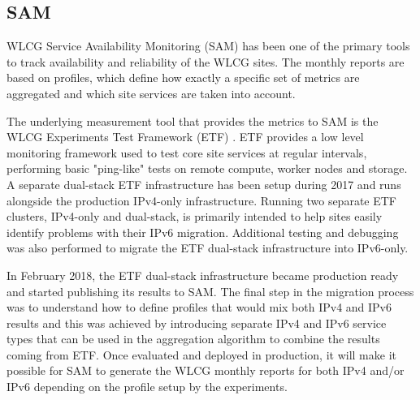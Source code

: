 
\subsection{SAM}
WLCG Service Availability Monitoring (SAM) \cite{sam} has been one of the primary tools to track
availability and reliability of the WLCG sites. The monthly 
reports are based on profiles, which define how exactly a specific set of metrics are aggregated and which site services are taken into account. 

The underlying measurement tool that provides the metrics to SAM is the WLCG Experiments Test Framework (ETF) \cite{etf}. ETF provides a low level monitoring framework used to test core site services at regular intervals, performing basic "ping-like" tests on remote compute, worker nodes and storage. A separate dual-stack ETF infrastructure has been setup during 2017 and runs alongside the production IPv4-only infrastructure. Running two separate ETF clusters, IPv4-only and dual-stack, is primarily intended to help sites easily identify problems with their IPv6 migration.
Additional testing and debugging was also performed to migrate the ETF dual-stack infrastructure into IPv6-only.

In February 2018, the ETF dual-stack infrastructure became production ready and started publishing its results to SAM. The final step in the migration process was to understand how to define profiles that would mix both IPv4 and IPv6 results and this was achieved by introducing separate IPv4 and IPv6 service types that can be used in the aggregation algorithm to combine the results coming from ETF. 
Once evaluated and deployed in production, it will make it possible for SAM to generate the WLCG monthly 
reports for both IPv4 and/or IPv6 depending on the profile setup by the experiments. 

